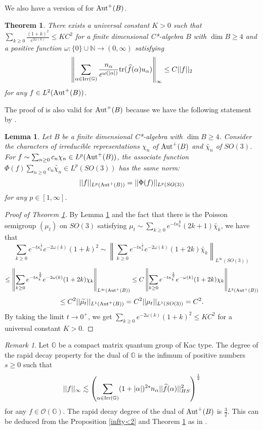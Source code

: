 \documentclass[12pt]{amsart}
\theoremstyle{plain} %
\newtheorem{theorem}[equation]{Theorem}
\newtheorem{lemma}[equation]{Lemma}
\theoremstyle{definition}
\theoremstyle{remark}
\newtheorem{remark}[equation]{Remark}
\begin{document}
We also have a version of \cite[Theorem 5.3]{You20} for ${\rm Aut}^+(B)$. 
 
\begin{theorem}\label{K}
There exists a universal constant $K>0$ such that $\sum_{k\geq0}\frac{(1+k)^2}{e^{2\omega(k)}}\leq KC^2$ for a finite dimensional C*-algebra $B$ with $\dim B\geq4$ and a positive function $\omega:\{0\}\cup\mathbb{N}\to(0,\infty)$ satisfying 
\[\left\lVert\sum_{\alpha\in{\rm Irr}(\mathbb{G})}\frac{n_{\alpha}}{e^{\omega(|\alpha|)}}{\rm tr}(\widehat{f}(\alpha)u_{\alpha})\right\rVert_{\infty}\leq C||f||_2\]
for any $f\in L^2({\rm Aut}^+(B))$.
\end{theorem}

The proof of \cite[Theorem 5.3]{You20} is also valid for ${\rm Aut}^+(B)$ because we have the following statement by \cite[Remark 4.6, Lemma 4.7]{You18}.

\begin{lemma}\label{Phi}
Let $B$ be a finite dimensional C*-algebra with $\dim B\geq4$.
Consider the characters of irreducible representations $\chi_n$ of ${\rm Aut}^+(B)$ and $\widetilde{\chi_n}$ of $SO(3)$.
For $f\sim \sum_{n\geq0}c_n\chi_n \in L^p({\rm Aut}^+(B))$, the associate function $\Phi(f)\sum_{n\geq0}c_n\widetilde{\chi_n} \in L^p(SO(3))$ has the same norm:
\[||f||_{L^p({\rm Aut}^+(B))}=||\Phi(f)||_{L^p(SO(3))}\]
for any $p\in [1, \infty]$.
\end{lemma}

\begin{proof}[Proof of Theorem \ref{K}]
By Lemma \ref{Phi} and the fact that there is the Poisson semigroup $(\mu_t)$ on $SO(3)$ satisfying $\mu_t\sim \sum_{k\geq0} e^{-t\kappa_k^{\frac{1}{2}}}(2k+1)\widetilde{\chi_k}$, we have that 
\[\sum_{k\geq0} e^{-t\kappa_k^{\frac{1}{2}}}e^{-2\omega(k)}(1+k)^2\sim \left\lVert \sum_{k\geq0}e^{-t\kappa_k^{\frac{1}{2}}}e^{-2\omega(k)}(1+2k)\widetilde{\chi_k}\right\rVert_{L^{\infty}(SO(3))}\]
\[\leq\left\lVert \sum_{k\geq0}e^{-t\kappa_k^{\frac{1}{2}}}e^{-2\omega(k)}(1+2k){\chi_k}\right\rVert_{L^{\infty}({\rm Aut}^+(B))}\leq C\left\lVert \sum_{k\geq0}e^{-t\kappa_k^{\frac{1}{2}}}e^{-\omega(k)}(1+2k){\chi_k}\right\rVert_{L^{2}({\rm Aut}^+(B))}\]
\[\leq C^2 ||\widetilde{\mu_t}||_{L^1({\rm Aut}^+(B))}=C^2||\mu_t||_{L^1(SO(3))}=C^2.\]
By taking the limit $t\to 0^+$, we get $\sum_{k\geq0}e^{-2\omega(k)}(1+k)^2\leq KC^2$ for a universal constant $K>0$.
\end{proof}

\begin{remark}
Let $\mathbb{G}$ be a compact matrix quantum group of Kac type. The degree of the rapid decay property for the dual of $\mathbb{G}$ is the infimum of positive numbers $s\geq0$ such that 
\[||f||_{\infty}\lesssim \left(\sum_{\alpha\in {\rm Irr}(\mathbb{G})}(1+|\alpha|)^{2s}n_{\alpha}||\widehat{f}(\alpha)||^2_{HS}\right)^{\frac{1}{2}}\]
for any $f \in \mathcal{O}(\mathbb{G})$.
The rapid decay degree of the dual of ${\rm Aut}^+(B)$ is $\frac{3}{2}$. This can be deduced from the Proposition \ref{infty<2} and Theorem \ref{K} as in \cite[Cororally 5.4]{You20}.
\end{remark}
\end{document}

